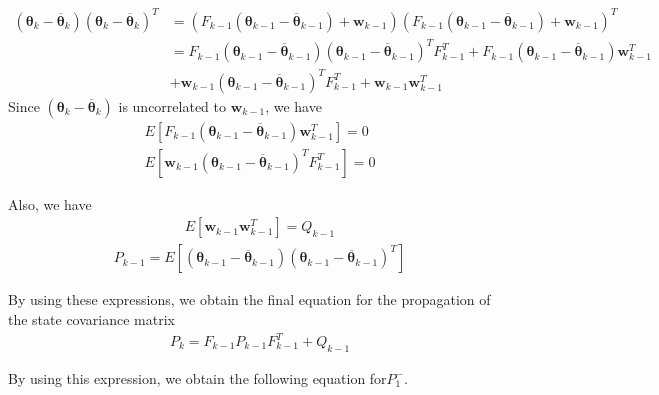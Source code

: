 \begin{align*}
	(\boldsymbol{\theta}_{k}-\overline{\boldsymbol{\theta}}_{k})(\boldsymbol{\theta}_{k}-\overline{\boldsymbol{\theta}}_{k})^{T} & = (F_{k-1}(\boldsymbol{\theta}_{k-1}-\overline{\boldsymbol{\theta}}_{k-1})+\mathbf{w}_{k-1})(F_{k-1}(\boldsymbol{\theta}_{k-1}-\overline{\boldsymbol{\theta}}_{k-1})+\mathbf{w}_{k-1})^{T}\\ 
																							 & = F_{k-1}(\boldsymbol{\theta}_{k-1}-\overline{\boldsymbol{\theta}}_{k-1})(\boldsymbol{\theta}_{k-1}-\overline{\boldsymbol{\theta}}_{k-1})^{T}F_{k-1}^{T}+F_{k-1}(\boldsymbol{\theta}_{k-1}-\overline{\boldsymbol{\theta}}_{k-1})\mathbf{w}_{k-1}^{T} \\ 
																							 & +\mathbf{w}_{k-1}(\boldsymbol{\theta}_{k-1}-\overline{\boldsymbol{\theta}}_{k-1})^{T}F_{k-1}^{T}+\mathbf{w}_{k-1}\mathbf{w}_{k-1}^{T}
\end{align*}
Since $(\boldsymbol{\theta}_{k}-\overline{\boldsymbol{\theta}}_{k})$ is uncorrelated to $\mathbf{w}_{k-1}$, we have
\begin{align*}
	E[F_{k-1}(\boldsymbol{\theta}_{k-1}-\overline{\boldsymbol{\theta}}_{k-1})\mathbf{w}_{k-1}^{T}]=0 \\E[\mathbf{w}_{k-1}(\boldsymbol{\theta}_{k-1}-\overline{\boldsymbol{\theta}}_{k-1})^{T}F_{k-1}^{T}]=0
\end{align*}

Also, we have
\begin{align*}
	E[\mathbf{w}_{k-1}\mathbf{w}_{k-1}^{T}]=Q_{k-1}
\end{align*}
\begin{align*}
	P_{k-1}=E[(\boldsymbol{\theta}_{k-1}-\overline{\boldsymbol{\theta}}_{k-1})(\boldsymbol{\theta}_{k-1}-\overline{\boldsymbol{\theta}}_{k-1})^{T}]
\end{align*}

By using these expressions, we obtain the final equation for the propagation of the state covariance matrix
\begin{align*}
	P_{k}=F_{k-1}P_{k-1}F_{k-1}^{T}+Q_{k-1}
\end{align*}


By using this expression, we obtain the following equation for$P_{1}^{-}$.


